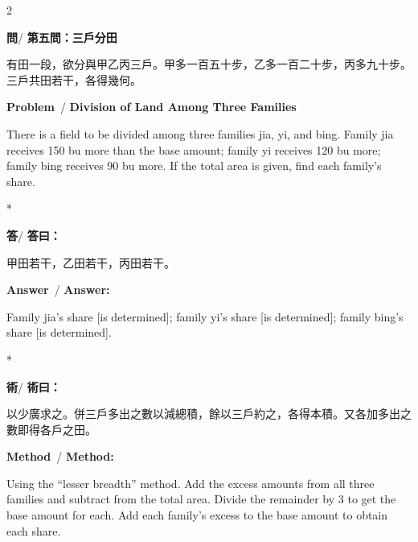 \documentclass[11pt,a4paper]{article}
\newcommand{\wen}{\textbf{\color{sectioncolor}問}}
\newcommand{\da}{\textbf{\color{answercolor}答}}
\newcommand{\shu}{\textbf{\color{methodcolor}術}}
\newcommand{\prb}{\textbf{\color{sectioncolor}Problem}}
\newcommand{\ans}{\textbf{\color{answercolor}Answer}}
\newcommand{\meth}{\textbf{\color{methodcolor}Method}}
\begin{document}
\begin{paracol}{2}

\begin{leftcolumn*}
\wen / \textbf{第五問：三戶分田}

有田一段，欲分與甲乙丙三戶。甲多一百五十步，乙多一百二十步，丙多九十步。三戶共田若干，各得幾何。
\end{leftcolumn*}

\begin{rightcolumn}
\prb\ / \textbf{Division of Land Among Three Families}

There is a field to be divided among three families 
jia, yi, and bing. Family jia receives 150 bu more than the base amount; 
family yi receives 120 bu more; family bing receives 90 bu more. If the 
total area is given, find each family's share.
\end{rightcolumn}

\switchcolumn[0]*

\begin{leftcolumn*}
\da / \textbf{答曰：}

甲田若干，乙田若干，丙田若干。
\end{leftcolumn*}

\begin{rightcolumn}
\ans\ / \textbf{Answer:}

Family jia's share [is determined]; family yi's share [is determined]; 
family bing's share [is determined].
\end{rightcolumn}

\switchcolumn[0]*

\begin{leftcolumn*}
\shu / \textbf{術曰：}

以少廣求之。併三戶多出之數以減總積，餘以三戶約之，各得本積。又各加多出之數即得各戶之田。
\end{leftcolumn*}

\begin{rightcolumn}
\meth\ / \textbf{Method:}

Using the ``lesser breadth'' method. Add the excess amounts 
from all three families and subtract from the total area. Divide the 
remainder by 3 to get the base amount for each. Add each family's excess 
to the base amount to obtain each share.
\end{rightcolumn}

\end{paracol}

\vspace{1em}
\end{document}
